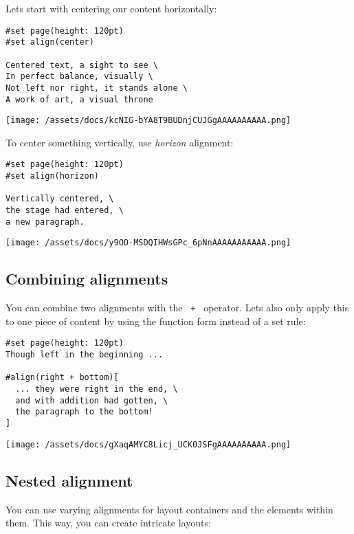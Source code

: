 Let\textquotesingle s start with centering our content horizontally:

\begin{verbatim}
#set page(height: 120pt)
#set align(center)

Centered text, a sight to see \
In perfect balance, visually \
Not left nor right, it stands alone \
A work of art, a visual throne
\end{verbatim}

\texttt{[image: /assets/docs/kcNIG-bYA8T9BUDnjCUJGgAAAAAAAAAA.png]}

To center something vertically, use \emph{horizon} alignment:

\begin{verbatim}
#set page(height: 120pt)
#set align(horizon)

Vertically centered, \
the stage had entered, \
a new paragraph.
\end{verbatim}

\texttt{[image: /assets/docs/y9OO-MSDQIHWsGPc\_6pNnAAAAAAAAAAA.png]}

\subsection{Combining alignments}\label{combining-alignments}

You can combine two alignments with the \texttt{\ +\ } operator.
Let\textquotesingle s also only apply this to one piece of content by
using the function form instead of a set rule:

\begin{verbatim}
#set page(height: 120pt)
Though left in the beginning ...

#align(right + bottom)[
  ... they were right in the end, \
  and with addition had gotten, \
  the paragraph to the bottom!
]
\end{verbatim}

\texttt{[image: /assets/docs/gXaqAMYC8Licj\_UCK0JSFgAAAAAAAAAA.png]}

\subsection{Nested alignment}\label{nested-alignment}

You can use varying alignments for layout containers and the elements
within them. This way, you can create intricate layouts:

